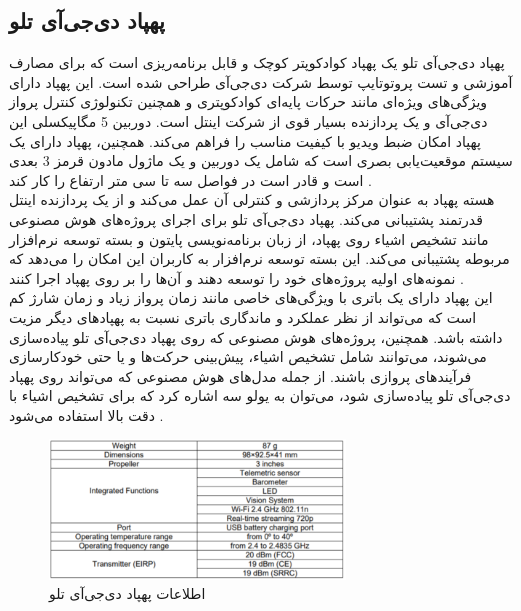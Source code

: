 \subsection{پهپاد دی‌جی‌آی تلو}
پهپاد دی‌جی‌آی تلو یک پهپاد کوادکوپتر کوچک و قابل برنامه‌ریزی است که برای مصارف آموزشی و تست پروتوتایپ توسط شرکت دی‌جی‌آی طراحی شده است. این پهپاد دارای ویژگی‌های ویژه‌ای مانند حرکات پایه‌ای کوادکوپتری و همچنین تکنولوژی 
کنترل پرواز دی‌جی‌آی و یک پردازنده بسیار قوی از شرکت اینتل است. دوربین 5 مگاپیکسلی این پهپاد امکان ضبط ویدیو با کیفیت مناسب را فراهم می‌کند. همچنین، پهپاد دارای یک سیستم موقعیت‌یابی بصری است که شامل 
یک دوربین و یک ماژول مادون قرمز 3 بعدی است و قادر است در فواصل سه تا سی متر ارتفاع  را کار کند .
\\
هسته پهپاد به عنوان مرکز پردازشی و کنترلی آن عمل می‌کند و از یک پردازنده اینتل قدرتمند پشتیبانی می‌کند. پهپاد دی‌جی‌آی تلو برای اجرای پروژه‌های هوش مصنوعی مانند تشخیص اشیاء روی پهپاد، از زبان 
برنامه‌نویسی پایتون و بسته توسعه نرم‌افزار مربوطه پشتیبانی می‌کند. این بسته توسعه نرم‌افزار به کاربران این امکان را می‌دهد که نمونه‌های اولیه پروژه‌های خود را توسعه دهند و آن‌ها را بر روی پهپاد اجرا کنند .
\\
این پهپاد دارای یک باتری با ویژگی‌های خاصی مانند زمان پرواز زیاد و زمان شارژ کم است که می‌تواند از نظر عملکرد و ماندگاری باتری نسبت به پهپاد‌های دیگر مزیت داشته باشد. همچنین، پروژه‌های هوش مصنوعی که روی پهپاد دی‌جی‌آی تلو پیاده‌سازی می‌شوند، 
می‌توانند شامل تشخیص اشیاء، پیش‌بینی حرکت‌ها و یا حتی خودکارسازی فرآیندهای پروازی باشند. از جمله مدل‌های هوش مصنوعی که می‌تواند روی پهپاد دی‌جی‌آی تلو پیاده‌سازی شود، می‌توان به یولو سه  اشاره کرد که برای تشخیص اشیاء با دقت بالا استفاده می‌شود \cite{bhujbal2022custom}.

\begin{figure}[h]
    \centering
    \includegraphics[width=0.7\textwidth]{table.png}
    \caption[طلاعات پهپاد دی‌جی‌آی تلو]{اطلاعات پهپاد دی‌جی‌آی تلو \cite{bhujbal2022custom}}
\end{figure}


